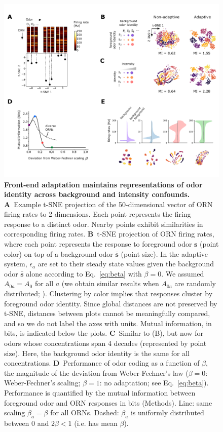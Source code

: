 \documentclass[9pt,lineno]{elife}
\begin{document}
\begin{figure}
	\begin{fullwidth}
	\includegraphics[width=.95\linewidth]{figure2}
	\caption{\footnotesize{\textbf{Front-end adaptation maintains representations of odor identity across background and intensity confounds.}
			\textbf{A}~Example t-SNE projection of the 50-dimensional vector of ORN firing rates to 2 dimensions. Each point represents the firing response to a distinct odor. Nearby points exhibit similarities in corresponding firing rates.
			\textbf{B}~t-SNE projection of ORN firing rates, where each point represents the response to foreground odor $\mathbf{s}$ (point color) on top of a background odor $\bar{\mathbf{s}}$ (point size). In the adaptive system, $\epsilon_a$ are set to their steady state values given the background odor $\bar{\mathbf{s}}$ alone according to Eq.~\ref{eq:beta} with $\beta=0$. We assumed $A_{0a}=A_0$ for all $a$ (we obtain similar results when $A_{0a}$ are randomly distributed; ). Clustering by color implies that responses cluster by foreground odor identity. Since global distances are not preserved by t-SNE, distances between plots cannot be meaningfully compared, and so we do not label the axes with units. {\color{blue} Mutual information, in bits, is indicated below the plots.}
			\textbf{C}~Similar to (B), but now for odors whose concentrations span 4 decades (represented by point size). Here, the background odor identity is the same for all concentrations. 
			\textbf{D}~Performance of odor coding as a function of $\beta$, the magnitude of the deviation from Weber-Fechner's law ($\beta=0$: Weber-Fechner's scaling; $\beta=1$: no adaptation; see Eq.~\ref{eq:beta}). {\color{blue} Performance is quantified by the mutual information between foreground odor and ORN responses in bits (Methods)}. Line: same scaling $\beta_a=\beta$ for all ORNs. Dashed: $\beta_a$ is uniformly distributed between 0 and $2\beta < 1$ (i.e. has mean $\beta$).
}}
\end{fullwidth}
\end{figure}
\end{document}
